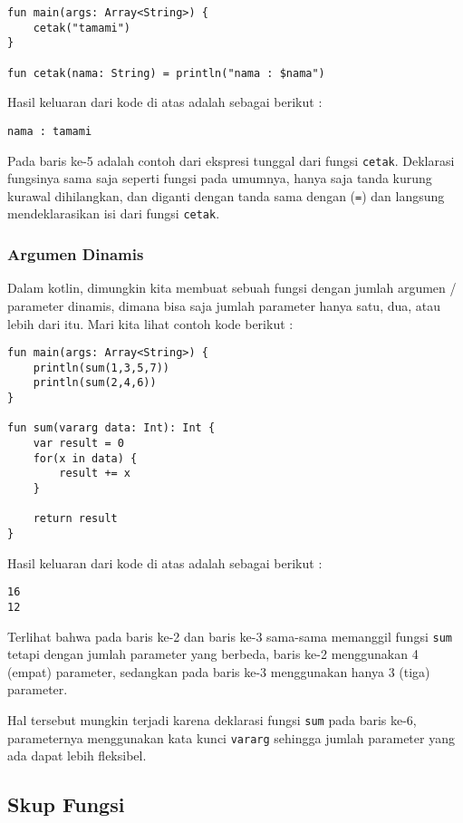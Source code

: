 \begin{lstlisting}
fun main(args: Array<String>) {
	cetak("tamami")
}

fun cetak(nama: String) = println("nama : $nama")
\end{lstlisting}

Hasil keluaran dari kode di atas adalah sebagai berikut :

\begin{lstlisting}
nama : tamami
\end{lstlisting}

Pada baris ke-5 adalah contoh dari ekspresi tunggal dari fungsi \texttt{cetak}. Deklarasi fungsinya sama saja seperti fungsi pada umumnya, hanya saja tanda kurung kurawal dihilangkan, dan diganti dengan tanda sama dengan (\texttt{=}) dan langsung mendeklarasikan isi dari fungsi \texttt{cetak}.

\subsubsection{Argumen Dinamis}

Dalam kotlin, dimungkin kita membuat sebuah fungsi dengan jumlah argumen / parameter dinamis, dimana bisa saja jumlah parameter hanya satu, dua, atau lebih dari itu. Mari kita lihat contoh kode berikut :

\begin{lstlisting}
fun main(args: Array<String>) {
	println(sum(1,3,5,7))
	println(sum(2,4,6))
}

fun sum(vararg data: Int): Int {
	var result = 0
	for(x in data) {
		result += x
	}
	
	return result
}
\end{lstlisting}

Hasil keluaran dari kode di atas adalah sebagai berikut :

\begin{lstlisting}
16
12
\end{lstlisting}

Terlihat bahwa pada baris ke-2 dan baris ke-3 sama-sama memanggil fungsi \texttt{sum} tetapi dengan jumlah parameter yang berbeda, baris ke-2 menggunakan 4 (empat) parameter, sedangkan pada baris ke-3 menggunakan hanya 3 (tiga) parameter.

Hal tersebut mungkin terjadi karena deklarasi fungsi \texttt{sum} pada baris ke-6, parameternya menggunakan kata kunci \texttt{vararg} sehingga jumlah parameter yang ada dapat lebih fleksibel.

\subsection{Skup Fungsi}

